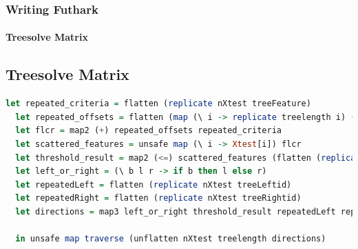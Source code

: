 \documentclass[12pt,t]{beamer}
\begin{document}
\begin{frame}[fragile]
  \frametitle{Writing Futhark}
  \framesubtitle{Treesolve Matrix}
\subsection{Treesolve Matrix}
\begin{minipage}{\textwidth}
\begin{lstlisting}[language=Haskell, breaklines]
let repeated_criteria = flatten (replicate nXtest treeFeature)
  let repeated_offsets = flatten (map (\ i -> replicate treelength i) (steps 0 nXtest dXtest))
  let flcr = map2 (+) repeated_offsets repeated_criteria
  let scattered_features = unsafe map (\ i -> Xtest[i]) flcr
  let threshold_result = map2 (<=) scattered_features (flatten (replicate nXtest treeThres_or_leaf))
  let left_or_right = (\ b l r -> if b then l else r)
  let repeatedLeft = flatten (replicate nXtest treeLeftid)
  let repeatedRight = flatten (replicate nXtest treeRightid)
  let directions = map3 left_or_right threshold_result repeatedLeft repeatedRight

  in unsafe map traverse (unflatten nXtest treelength directions)
\end{lstlisting}
\end{minipage}

%
%

\colorbox{lightgray}{\usebox\lstboxfive}

\end{frame}
\end{document}

